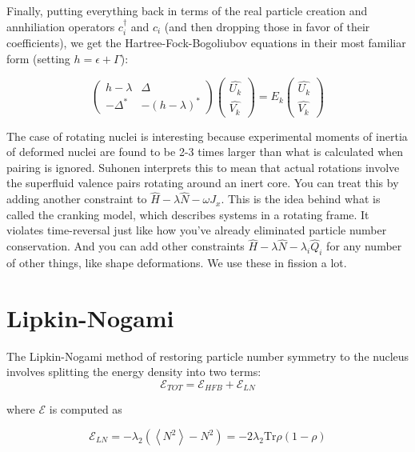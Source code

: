Finally, putting everything back in terms of the real particle creation and annhiliation operators $c_i^\dagger$ and $c_i$ (and then dropping those in favor of their coefficients), we get the Hartree-Fock-Bogoliubov equations in their most familiar form (setting $h=\epsilon+\Gamma$):

\begin{equation}
\left(\begin{array}{cc}
h-\lambda & \Delta \\
-\Delta^* & -(h-\lambda)^*
\end{array}\right) \left(\begin{array}{c}
\hat{U_k} \\
\hat{V_k}
\end{array}\right)
= E_k\left(\begin{array}{c}
\hat{U_k} \\
\hat{V_k}
\end{array}\right)
\end{equation}

The case of rotating nuclei is interesting because experimental moments of inertia of deformed nuclei are found to be 2-3 times larger than what is calculated when pairing is ignored. Suhonen interprets this to mean that actual rotations involve the superfluid valence pairs rotating around an inert core. You can treat this by adding another constraint to $\hat{H} - \lambda\hat{N} - \omega J_x$. This is the idea behind what is called the cranking model, which describes systems in a rotating frame. It violates time-reversal just like how you've already eliminated particle number conservation. And you can add other constraints $\hat{H} - \lambda\hat{N} - \lambda_i \hat{Q}_i$ for any number of other things, like shape deformations. We use these in fission a lot.

\section*{Lipkin-Nogami}
The Lipkin-Nogami method of restoring particle number symmetry to the nucleus involves splitting the energy density into two terms:
\begin{equation*}
\mathcal{E}_{TOT} = \mathcal{E}_{HFB} + \mathcal{E}_{LN}
\end{equation*}

\noindent where $\mathcal{E}$ is computed as

\begin{equation*}
\mathcal{E}_{LN} = -\lambda_2\left(\left\langle N^2\right\rangle -N^2\right) = -2\lambda_2 \mathrm{Tr}\rho\left(1-\rho\right)
\end{equation*}

